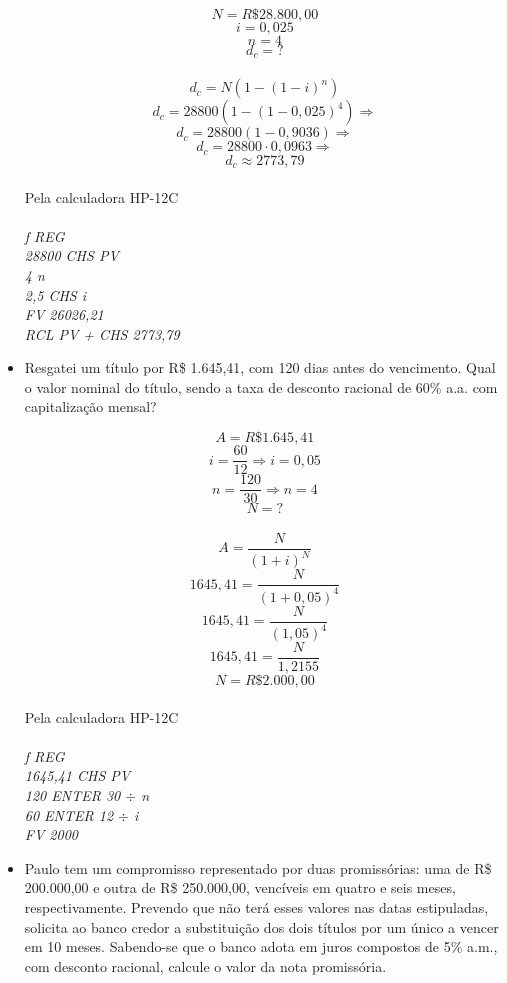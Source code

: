 \documentclass[a4paper, 12pt]{article}
\begin{document}
\begin{itemize}
$$ N = R\$28.800,00 $$
$$ i = 0,025 $$
$$ n = 4 $$
$$ d_c = ? $$  
\\
$$ d_c = N(1-(1-i)^n) $$
$$ d_c = 28800(1-(1-0,025)^4) \Rightarrow $$
$$ d_c = 28800(1-0,9036) \Rightarrow $$
$$ d_c = 28800 \cdot 0,0963 \Rightarrow $$
$$ \boxed{d_c \approx 2773,79} $$
\\
Pela calculadora HP-12C\\\\
\emph{f REG}\\
\emph{28800 CHS PV}\\
\emph{4 n}\\
\emph{2,5 CHS i}\\
\emph{FV 26026,21}\\
\emph{RCL PV + CHS 2773,79}

\item Resgatei um título por R\$ 1.645,41, com 120 dias antes do vencimento. Qual o valor nominal do título, sendo a taxa de desconto racional de 60\% a.a. com capitalização mensal?
  
$$ A = R\$1.645,41 $$
$$ i = \frac{60}{12} \Rightarrow i = 0,05 $$
$$ n = \frac{120}{30} \Rightarrow n = 4 $$
$$ N = ? $$  
\\
$$ A = \frac{N}{(1+i)^N} $$
$$ 1645,41 = \frac{N}{(1+0,05)^4} $$
$$ 1645,41 = \frac{N}{(1,05)^4} $$
$$ 1645,41 = \frac{N}{1,2155} $$
$$ \boxed{N = R\$2.000,00} $$
\\
Pela calculadora HP-12C\\\\
\emph{f REG}\\
\emph{1645,41 CHS PV}\\
\emph{120 ENTER 30 $ \div $ n}\\
\emph{60 ENTER 12 $ \div $ i}\\
\emph{FV 2000}  

\item Paulo tem um compromisso representado por duas promissórias: uma de R\$ 200.000,00 e outra de R\$ 250.000,00, vencíveis em quatro e seis meses, respectivamente. Prevendo que não terá esses valores nas datas estipuladas, solicita ao banco credor a substituição dos dois títulos por um único a vencer em  10  meses.  Sabendo-se  que  o  banco  adota  em  juros  compostos  de  5\% a.m.,  com  desconto  racional,  calcule  o  valor  da  nota  promissória.


\end{itemize}
\end{document}
